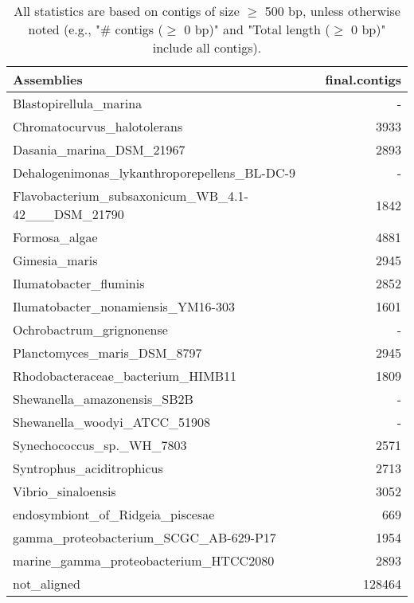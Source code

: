 \documentclass[12pt,a4paper]{article}
\begin{document}
\begin{table}[ht]
\begin{center}
\caption{All statistics are based on contigs of size $\geq$ 500 bp, unless otherwise noted (e.g., "\# contigs ($\geq$ 0 bp)" and "Total length ($\geq$ 0 bp)" include all contigs).}
\begin{tabular}{|l*{1}{|r}|}
\hline
Assemblies & final.contigs \\ \hline
Blastopirellula\_marina & - \\ \hline
Chromatocurvus\_halotolerans & 3933 \\ \hline
Dasania\_marina\_DSM\_21967 & 2893 \\ \hline
Dehalogenimonas\_lykanthroporepellens\_BL-DC-9 & - \\ \hline
Flavobacterium\_subsaxonicum\_WB\_4.1-42\_\_\_DSM\_21790 & 1842 \\ \hline
Formosa\_algae & 4881 \\ \hline
Gimesia\_maris & 2945 \\ \hline
Ilumatobacter\_fluminis & 2852 \\ \hline
Ilumatobacter\_nonamiensis\_YM16-303 & 1601 \\ \hline
Ochrobactrum\_grignonense & - \\ \hline
Planctomyces\_maris\_DSM\_8797 & 2945 \\ \hline
Rhodobacteraceae\_bacterium\_HIMB11 & 1809 \\ \hline
Shewanella\_amazonensis\_SB2B & - \\ \hline
Shewanella\_woodyi\_ATCC\_51908 & - \\ \hline
Synechococcus\_sp.\_WH\_7803 & 2571 \\ \hline
Syntrophus\_aciditrophicus & 2713 \\ \hline
Vibrio\_sinaloensis & 3052 \\ \hline
endosymbiont\_of\_Ridgeia\_piscesae & 669 \\ \hline
gamma\_proteobacterium\_SCGC\_AB-629-P17 & 1954 \\ \hline
marine\_gamma\_proteobacterium\_HTCC2080 & 2893 \\ \hline
not\_aligned & 128464 \\ \hline
\end{tabular}
\end{center}
\end{table}
\end{document}
